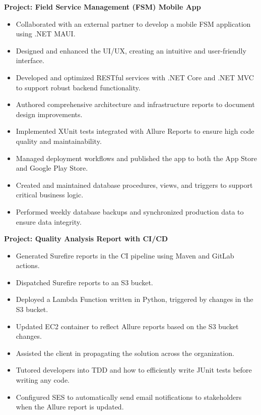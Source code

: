 \documentclass[10pt,a4paper]{altacv}
\begin{document}
\textbf{Project: Field Service Management (FSM) Mobile App}
\begin{itemize}
    \setlength{\itemindent}{0.5em}
    \item[--] Collaborated with an external partner to develop a mobile FSM application using .NET MAUI.
    \item[--] Designed and enhanced the UI/UX, creating an intuitive and user-friendly interface.
    \item[--] Developed and optimized RESTful services with .NET Core and .NET MVC to support robust backend functionality.
    \item[--] Authored comprehensive architecture and infrastructure reports to document design improvements.
    \item[--] Implemented XUnit tests integrated with Allure Reports to ensure high code quality and maintainability.
    \item[--] Managed deployment workflows and published the app to both the App Store and Google Play Store.
    \item[--] Created and maintained database procedures, views, and triggers to support critical business logic.
    \item[--] Performed weekly database backups and synchronized production data to ensure data integrity.
\end{itemize}



\break
\newpage
{}

\textbf{Project: Quality Analysis Report with CI/CD}
\begin{itemize}
    \setlength{\itemindent}{0.5em}
    \item[--] Generated Surefire reports in the CI pipeline using Maven and GitLab actions.
    \item[--] Dispatched Surefire reports to an S3 bucket.
    \item[--] Deployed a Lambda Function written in Python, triggered by changes in the S3 bucket.
    \item[--] Updated EC2 container to reflect Allure reports based on the S3 bucket changes.
    \item[--] Assisted the client in propagating the solution across the organization.
    \item[--] Tutored developers into TDD and how to efficiently write JUnit tests before writing any code.
    \item[--] Configured SES to automatically send email notifications to stakeholders when the Allure report is updated.
\end{itemize}
\end{document}
